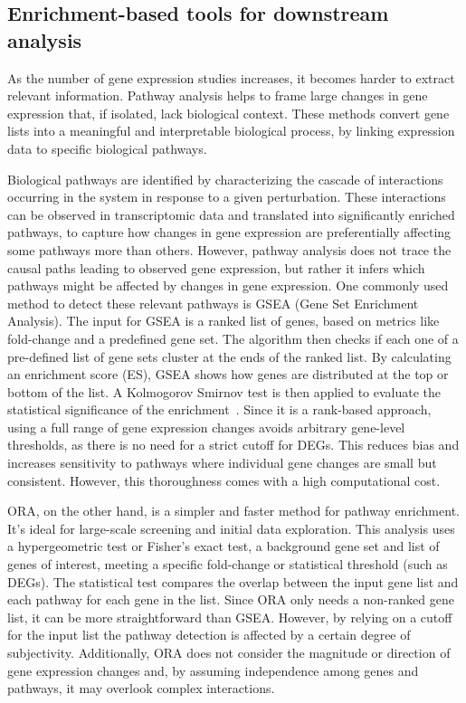 \subsection{Enrichment-based tools for downstream analysis} %
\label{sub:enrichment_based_tools}

As the number of gene expression studies increases, it becomes harder to extract relevant information. Pathway analysis helps to frame large changes in gene expression that, if isolated, lack biological context. These methods convert gene lists into a meaningful and interpretable biological process, by linking expression data to specific biological pathways.

Biological pathways are identified by characterizing the cascade of interactions occurring in the system in response to a given perturbation. These interactions can be observed in transcriptomic data and translated into significantly enriched pathways, to capture how changes in gene expression are preferentially affecting some pathways more than others. However, pathway analysis does not trace the causal paths leading to observed gene expression, but rather it infers which pathways might be affected by changes in gene expression. One commonly used method to detect these relevant pathways is GSEA (Gene Set Enrichment Analysis). The input for GSEA is a ranked list of genes, based on metrics like fold-change and a predefined gene set. The algorithm then checks if each one of a pre-defined list of gene sets cluster at the ends of the ranked list. By calculating an enrichment score (ES), GSEA shows how genes are distributed at the top or bottom of the list. A Kolmogorov Smirnov test is then applied to evaluate the statistical significance of the enrichment~\cite{RN152}. Since it is a rank-based approach, using a full range of gene expression changes avoids arbitrary gene-level thresholds, as there is no need for a strict cutoff for DEGs. This reduces bias and increases sensitivity to pathways where individual gene changes are small but consistent. However, this thoroughness comes with a high computational cost. 

\gls{ORA}, on the other hand, is a simpler and faster method for pathway enrichment. It's ideal for large-scale screening and initial data exploration. This analysis uses a hypergeometric test or Fisher's exact test, a background gene set and list of genes of interest, meeting a specific fold-change or statistical threshold (such as DEGs). The statistical test compares the overlap between the input gene list and each pathway for each gene in the list. Since ORA only needs a non-ranked gene list, it can be more straightforward than GSEA. However, by relying on a cutoff for the input list the pathway detection is affected by a certain degree of subjectivity. Additionally, ORA does not consider the magnitude or direction of gene expression changes and, by assuming independence among genes and pathways, it may overlook complex interactions. 

